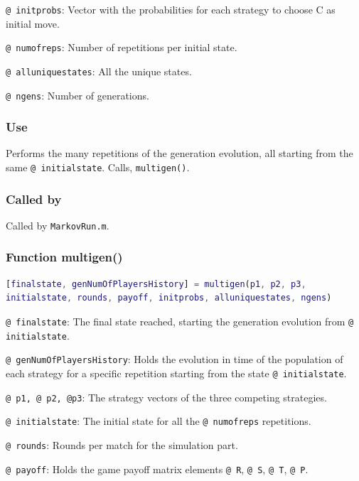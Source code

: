 \documentclass[12pt]{report}
\begin{document}
\texttt{@ initprobs}: Vector with the probabilities for each strategy to choose C as  initial move.

\texttt{@ numofreps}: Number of repetitions per initial state.

\texttt{@ alluniquestates}: All the unique states.

\texttt{@ ngens}: Number of generations.

\subsubsection*{Use }
Performs the many repetitions of the generation evolution, all starting from the same \texttt{@ initialstate}. Calls, \texttt{multigen()}.

\subsubsection*{Called by}
Called by \texttt{MarkovRun.m}.








\subsubsection*{Function multigen()}

\begin{lstlisting}[language=Matlab]
[finalstate, genNumOfPlayersHistory] = multigen(p1, p2, p3,
initialstate, rounds, payoff, initprobs, alluniquestates, ngens)

\end{lstlisting}

\texttt{@ finalstate}: The final state reached, starting the generation evolution from \texttt{@ initialstate}.

\texttt{@ genNumOfPlayersHistory}: Holds the evolution in time of the population of each strategy for a specific repetition starting from the state \texttt{@ initialstate}.

\texttt{@ p1, @ p2, @p3}: The strategy vectors of the three competing strategies.

\texttt{@ initialstate}: The initial state for all the \texttt{@ numofreps} repetitions.

\texttt{@ rounds}: Rounds per match for the simulation part.

\texttt{@ payoff}: Holds the game payoff matrix elements \texttt{@ R}, \texttt{@ S}, \texttt{@ T}, \texttt{@ P}. 
\end{document}
